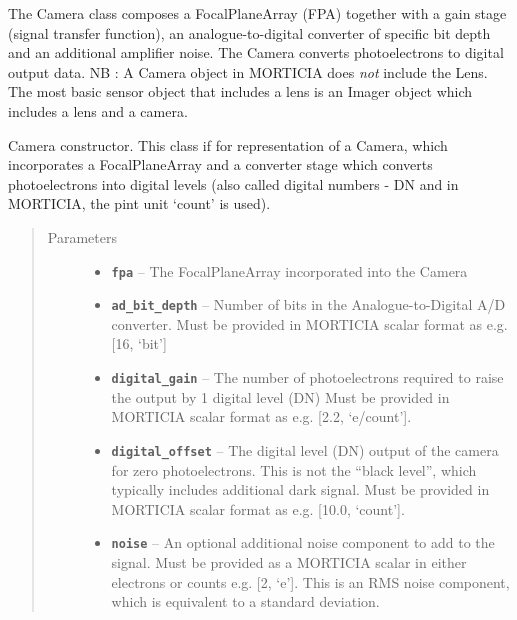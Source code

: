 \documentclass[a4paper,10pt,english]{sphinxmanual}
\begin{document}
\begin{fulllineitems}
\label{packages:electro.Camera}
The Camera class composes a FocalPlaneArray (FPA) together with a gain stage (signal transfer function),
an analogue-to-digital converter of specific bit depth and an additional amplifier noise. The Camera
converts photoelectrons to digital output data.
NB : A Camera object in MORTICIA does \emph{not} include the Lens. The most basic sensor object that includes a lens
is an Imager object which includes a lens and a camera.

Camera constructor. This class if for representation of a Camera, which incorporates
a FocalPlaneArray and a converter stage which converts photoelectrons into digital levels (also called
digital numbers - DN and in MORTICIA, the pint unit `count' is used).
\begin{quote}\begin{description}
\item[{Parameters}] \leavevmode\begin{itemize}
\item {} 
\textbf{\texttt{fpa}} -- The FocalPlaneArray incorporated into the Camera

\item {} 
\textbf{\texttt{ad\_bit\_depth}} -- Number of bits in the Analogue-to-Digital A/D converter. Must be provided in MORTICIA
scalar format as e.g. {[}16, `bit'{]}

\item {} 
\textbf{\texttt{digital\_gain}} -- The number of photoelectrons required to raise the output by 1 digital level (DN)
Must be provided in MORTICIA scalar format as e.g. {[}2.2, `e/count'{]}.

\item {} 
\textbf{\texttt{digital\_offset}} -- The digital level (DN) output of the camera for zero photoelectrons. This is not
the ``black level'', which typically includes additional dark signal. Must be provided in MORTICIA
scalar format as e.g. {[}10.0, `count'{]}.

\item {} 
\textbf{\texttt{noise}} -- An optional additional noise component to add to the signal. Must be provided as a
MORTICIA scalar in either electrons or counts e.g. {[}2, `e'{]}. This is an RMS noise component,
which is equivalent to a standard deviation.


\end{itemize}
\end{description}
\end{quote}
\end{fulllineitems}
\end{document}
